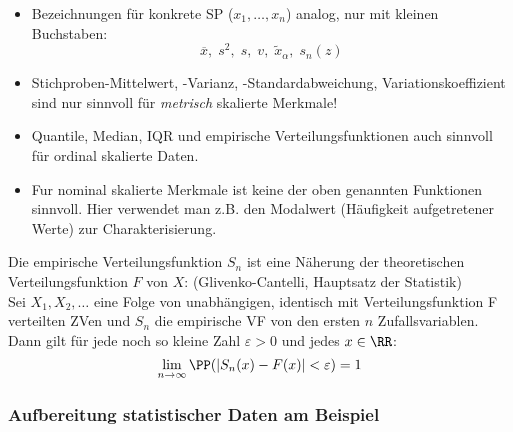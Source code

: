 \documentclass{scrreprt}
\begin{document}
\begin{itemize}
\item Bezeichnungen für konkrete SP ($x_1, \ldots ,x_n$) analog, nur mit kleinen Buchstaben:
$$\overline{x},\; s^2,\; s, \; v, \; \tilde{x}_\alpha, \; s_n(z) $$
\item Stichproben-Mittelwert, -Varianz, -Standardabweichung, Variationskoeffizient sind nur sinnvoll für \emph{metrisch} skalierte Merkmale!
\item Quantile, Median, IQR und empirische Verteilungsfunktionen auch sinnvoll für ordinal skalierte Daten.
\item Fur nominal skalierte Merkmale ist keine der oben genannten Funktionen sinnvoll. Hier verwendet man z.B. den Modalwert (Häufigkeit aufgetretener Werte) zur Charakterisierung.
\end{itemize}
Die empirische Verteilungsfunktion $S_n$ ist eine Näherung der theoretischen Verteilungsfunktion $F$ von $X$:
 (Glivenko-Cantelli, Hauptsatz der Statistik)\\
Sei $X_1, X_2, \ldots$ eine Folge von unabhängigen, identisch mit Verteilungsfunktion F verteilten ZVen und $S_n$ die empirische VF von den ersten $n$ Zufallsvariablen. Dann gilt für jede noch so kleine Zahl $\varepsilon > 0$ und jedes $x \in \RR$:
$$\lim_{n\to \infty} \PP(|S_n(x) - F(x)|<\varepsilon) = 1$$

\subsubsection{Aufbereitung statistischer Daten am Beispiel}
\end{document}
